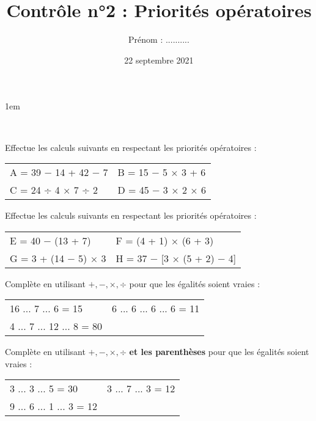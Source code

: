 \documentclass[a4paper,11pt]{article}
\title{Contrôle n°2 : Priorités opératoires}
\date{22 septembre 2021}
\author{Prénom : ..........}
\makeatletter
\renewcommand{\maketitle}{%
    \topskip1em
	\@author \hfill \@date \\

	\begin{center}
		\begin{huge}
			\@title \\[1em]
		\end{huge}
	\end{center}
}
\makeatother
\begin{document}
\maketitle

\begin{question}[(4 points)] Effectue les calculs suivants en respectant les priorités opératoires :

	\noindent
	\begin{tabular}{p{}|p{}}
		A = 39 − 14 + 42 − 7 & B = 15 − 5 × 3 + 6 \vspace{6em}  \\
		C = 24 ÷ 4 × 7 ÷ 2   & D = 45 − 3 × 2 × 6  \vspace{6em}
	\end{tabular}
\end{question}


\begin{question}[(4 points)] Effectue les calculs suivants en respectant les priorités opératoires :

	\noindent
	\begin{tabular}{p{}|p{}}
		E = 40 − (13 + 7)    & F = (4 + 1) × (6 + 3) \vspace{7em}      \\
		G = 3 + (14 − 5) × 3 & H = 37 − [3 × (5 + 2) − 4] \vspace{7em}
	\end{tabular}
\end{question}


\begin{question}[(3 points)] Complète en utilisant $+,-,×,÷$ pour que les égalités soient vraies :

	\vspace{1em}
	\noindent
	\begin{tabular}{p{}p{}}
		16 ... 7 ... 6 = 15       &
		6 ... 6 ... 6 ... 6 = 11 \vspace{0.5em} \\
		4 ... 7 ... 12 ... 8 = 80 &
	\end{tabular}
	\vspace{1em}

	Complète en utilisant $+,-,×,÷$ \textbf{et les parenthèses} pour que les égalités soient vraies :

	\vspace{1em}
	\noindent
	\begin{tabular}{p{}p{}}
		3 ... 3 ... 5 = 30       &
		3 ... 7 ... 3 = 12 \vspace{0.5em} \\
		9 ... 6 ... 1 ... 3 = 12 &
	\end{tabular}
	\vspace{1em}
\end{question}
\end{document}
